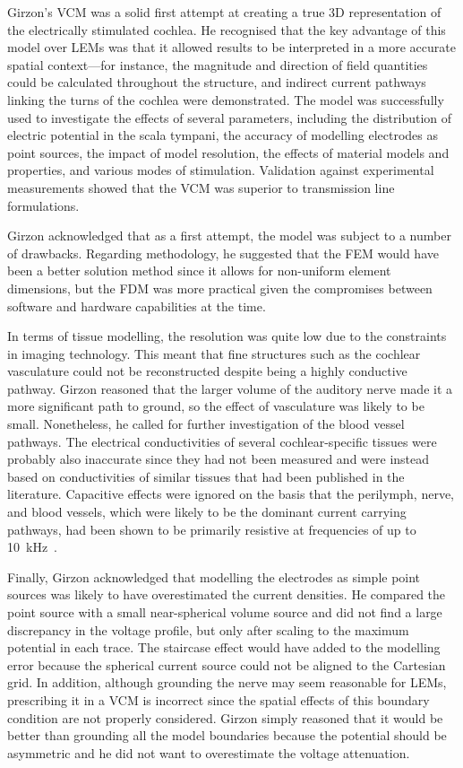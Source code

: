 Girzon's VCM was a solid first attempt at creating a true 3D representation of
the electrically stimulated cochlea. He recognised that the key advantage of
this model over LEMs was that it allowed results to be interpreted in a more
accurate spatial context---for instance, the magnitude and direction of field
quantities could be calculated throughout the structure, and indirect current
pathways linking the turns of the cochlea were demonstrated. The model was
successfully used to investigate the effects of several parameters, including
the distribution of electric potential in the scala tympani, the accuracy of
modelling electrodes as point sources, the impact of model resolution, the
effects of material models and properties, and various modes of stimulation.
Validation against \invivo{} experimental measurements showed that the VCM was
superior to transmission line formulations.

Girzon acknowledged that as a first attempt, the model was subject to a number
of drawbacks. Regarding methodology, he suggested that the FEM would have been a
better solution method since it allows for non-uniform element dimensions, but
the FDM was more practical given the compromises between software and hardware
capabilities at the time.

In terms of tissue modelling, the resolution was quite low due to the
constraints in imaging technology. This meant that fine structures such as the
cochlear vasculature could not be reconstructed despite being a highly
conductive pathway. Girzon reasoned that the larger volume of the auditory nerve
made it a more significant path to ground, so the effect of vasculature was
likely to be small. Nonetheless, he called for further investigation of the
blood vessel pathways. The electrical conductivities of several
cochlear-specific tissues were probably also inaccurate since they had not been
measured and were instead based on conductivities of similar tissues that had
been published in the literature. Capacitive effects were ignored on the basis
that the perilymph, nerve, and blood vessels, which were likely to be the
dominant current carrying pathways, had been shown to be primarily resistive at
frequencies of up to 10~kHz~\cite{schwan1957capacitive,geddes1967,spelman1982}.

Finally, Girzon acknowledged that modelling the electrodes as simple point
sources was likely to have overestimated the current densities. He compared the
point source with a small near-spherical volume source and did not find a large
discrepancy in the voltage profile, but only after scaling to the maximum
potential in each trace. The staircase effect would have added to the modelling
error because the spherical current source could not be aligned to the Cartesian
grid. In addition, although grounding the nerve may seem reasonable for LEMs,
prescribing it in a VCM is incorrect since the spatial effects of this boundary
condition are not properly considered. Girzon simply reasoned that it would be
better than grounding all the model boundaries because the potential should be
asymmetric and he did not want to overestimate the voltage attenuation.

